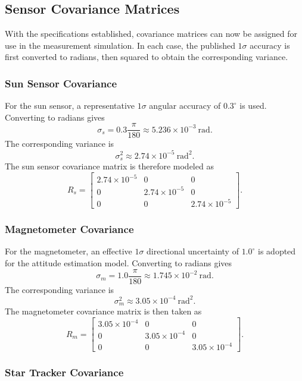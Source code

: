 \documentclass[12pt]{article}
\begin{document}
\subsection{Sensor Covariance Matrices}

With the specifications established, covariance matrices can now be assigned for use in the measurement simulation. In each case, the published \(1\sigma\) accuracy is first converted to radians, then squared to obtain the corresponding variance.

\subsubsection{Sun Sensor Covariance}

For the sun sensor, a representative \(1\sigma\) angular accuracy of \(0.3^\circ\) is used. Converting to radians gives
\[
\sigma_s = 0.3\frac{\pi}{180} \approx 5.236\times 10^{-3}\ \text{rad}.
\]
The corresponding variance is
\[
\sigma_s^2 \approx 2.74\times 10^{-5}\ \text{rad}^2.
\]
The sun sensor covariance matrix is therefore modeled as
\[
R_s
=
\begin{bmatrix}
2.74\times 10^{-5} & 0 & 0 \\
0 & 2.74\times 10^{-5} & 0 \\
0 & 0 & 2.74\times 10^{-5}
\end{bmatrix}.
\]

\subsubsection{Magnetometer Covariance}

For the magnetometer, an effective \(1\sigma\) directional uncertainty of \(1.0^\circ\) is adopted for the attitude estimation model. Converting to radians gives
\[
\sigma_m = 1.0\frac{\pi}{180} \approx 1.745\times 10^{-2}\ \text{rad}.
\]
The corresponding variance is
\[
\sigma_m^2 \approx 3.05\times 10^{-4}\ \text{rad}^2.
\]
The magnetometer covariance matrix is then taken as
\[
R_m
=
\begin{bmatrix}
3.05\times 10^{-4} & 0 & 0 \\
0 & 3.05\times 10^{-4} & 0 \\
0 & 0 & 3.05\times 10^{-4}
\end{bmatrix}.
\]

\subsubsection{Star Tracker Covariance}
\end{document}
